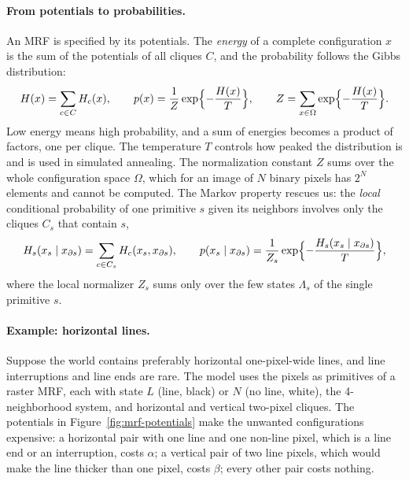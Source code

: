 \paragraph{From potentials to probabilities.}
An MRF is specified by its potentials. The \emph{energy} of a complete
configuration $x$ is the sum of the potentials of all cliques $C$, and the
probability follows the Gibbs distribution:
\begin{equation}
  H(x) = \sum_{c\in C} H_c(x),
  \qquad
  p(x) = \frac1Z\exp\Bigl\{-\frac{H(x)}{T}\Bigr\},
  \qquad
  Z = \sum_{x\in\Omega}\exp\Bigl\{-\frac{H(x)}{T}\Bigr\}.
  \label{eq:gibbs}
\end{equation}
\noindent
Low energy means high probability, and a sum of energies becomes a product of
factors, one per clique. The temperature $T$ controls how peaked the
distribution is and is used in simulated annealing. The normalization constant
$Z$ sums over the whole configuration space $\Omega$, which for an image of
$N$ binary pixels has $2^N$ elements and cannot be computed. The Markov property
rescues us: the \emph{local} conditional probability of one primitive $s$ given
its neighbors involves only the cliques $C_s$ that contain $s$,
\begin{equation}
  H_s(x_s\mid x_{\partial s}) = \sum_{c\in C_s} H_c(x_s, x_{\partial s}),
  \qquad
  p(x_s\mid x_{\partial s})
  = \frac{1}{Z_s}\exp\Bigl\{-\frac{H_s(x_s\mid x_{\partial s})}{T}\Bigr\},
  \label{eq:local-gibbs}
\end{equation}
\noindent
where the local normalizer $Z_s$ sums only over the few states $\Lambda_s$ of
the single primitive $s$.

\paragraph{Example: horizontal lines.}
Suppose the world contains preferably horizontal one-pixel-wide lines, and line
interruptions and line ends are rare. The model uses the pixels as primitives
of a raster MRF, each with state $L$ (line, black) or $N$ (no line, white), the
4-neighborhood system, and horizontal and vertical two-pixel cliques. The
potentials in Figure~\ref{fig:mrf-potentials} make the unwanted configurations
expensive: a horizontal pair with one line and one non-line pixel, which is a
line end or an interruption, costs $\alpha$; a vertical pair of two line
pixels, which would make the line thicker than one pixel, costs $\beta$; every
other pair costs nothing.

